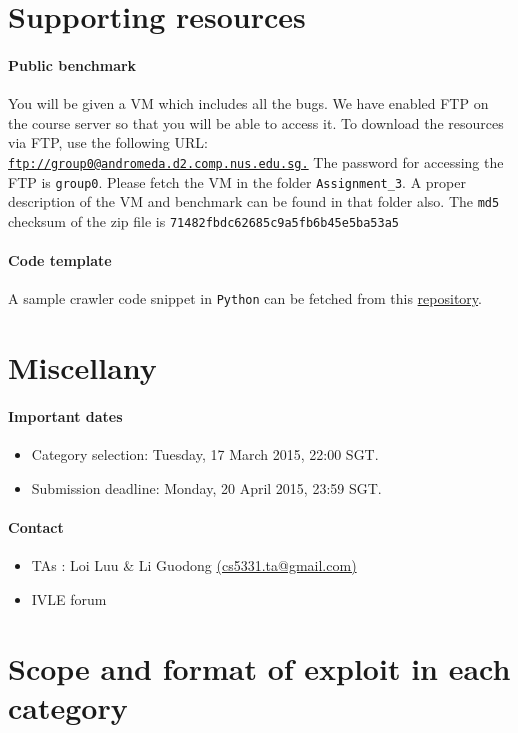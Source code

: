 \documentclass{article}[10pt]
\begin{document}
\section{Supporting resources}
\paragraph{Public benchmark} You will be given a VM which includes all the bugs. We have enabled FTP on 
the course server so that you will be able to access it. To download 
the resources via FTP, use the following URL: 
\href{ftp://group0@andromeda.d2.comp.nus.edu.sg}{\tt ftp://group0@andromeda.d2.comp.nus.edu.sg.}
The password for accessing the FTP is \texttt{group0}. Please fetch the VM in the folder {\tt Assignment\_3}. A proper description of the VM and benchmark can be found in that folder also. The {\tt md5} checksum of the zip file is {\tt 71482fbdc62685c9a5fb6b45e5ba53a5}

\paragraph{Code template} A sample crawler code snippet in {\tt Python} can be fetched from this \href{https://github.com/Dexter-JS/Scanner}{repository}.

\section{Miscellany}
\paragraph{Important dates}
\begin{itemize}
	\item Category selection:  Tuesday, 17 March 2015,  22:00 SGT.
	\item Submission deadline: Monday, 20 April 2015, 23:59 SGT.
\end{itemize}

\paragraph{Contact}
\begin{itemize}
\item TAs : Loi Luu \& Li Guodong \href{mailto:cs5331.ta@gmail.com}{(cs5331.ta@gmail.com)}
\item IVLE forum
\end{itemize}

\section{Scope and format of exploit in each category}
\label{exploit-format}
\end{document}
